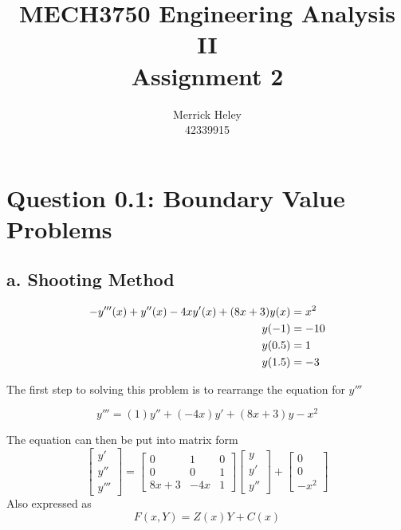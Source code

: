 \documentclass[a4paper,11pt,titlepage]{article}
\title{
MECH3750 Engineering Analysis II \\ 
Assignment 2
}
\author{
Merrick Heley\\
42339915
}
\begin{document}
\maketitle

\section*{Question 0.1: Boundary Value Problems}
\subsection*{a. Shooting Method}

\begin{align}
-y'''(x) + y''(x) - 4xy'(x) + (8x + 3)y(x) &= x^2 \label{eq:q1bvp}\\
y(-1) & = -10 \notag\\
y(0.5) & = 1 \notag\\
y(1.5) & = -3 \notag
\end{align}

The first step to solving this problem is to rearrange the equation for $y'''$

\begin{equation}
y''' = (1)y'' + (-4x)y' + (8x + 3)y - x^2
\end{equation}

The equation can then be put into matrix form
\begin{equation}
\begin{bmatrix}
y' \\
y'' \\
y'''
\end{bmatrix}
=
\begin{bmatrix}
    0       &   1       &   0 \\
    0       &   0       &   1 \\
    8x+3    &   -4x     &   1
\end{bmatrix}
\begin{bmatrix}
y \\
y' \\
y''
\end{bmatrix}
+
\begin{bmatrix}
0 \\
0 \\
-x^2
\end{bmatrix}\label{eq:rk4mat}
\end{equation}
Also expressed as
\begin{equation}
F(x, Y) = Z(x)Y + C(x) \label{eq:rk4func}
\end{equation}
\end{document}
